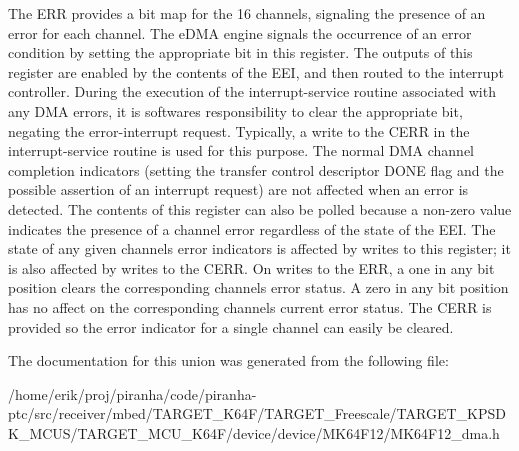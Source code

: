 The E\+RR provides a bit map for the 16 channels, signaling the presence of an error for each channel. The e\+D\+MA engine signals the occurrence of an error condition by setting the appropriate bit in this register. The outputs of this register are enabled by the contents of the E\+EI, and then routed to the interrupt controller. During the execution of the interrupt-\/service routine associated with any D\+MA errors, it is software\textquotesingle{}s responsibility to clear the appropriate bit, negating the error-\/interrupt request. Typically, a write to the C\+E\+RR in the interrupt-\/service routine is used for this purpose. The normal D\+MA channel completion indicators (setting the transfer control descriptor D\+O\+NE flag and the possible assertion of an interrupt request) are not affected when an error is detected. The contents of this register can also be polled because a non-\/zero value indicates the presence of a channel error regardless of the state of the E\+EI. The state of any given channel\textquotesingle{}s error indicators is affected by writes to this register; it is also affected by writes to the C\+E\+RR. On writes to the E\+RR, a one in any bit position clears the corresponding channel\textquotesingle{}s error status. A zero in any bit position has no affect on the corresponding channel\textquotesingle{}s current error status. The C\+E\+RR is provided so the error indicator for a single channel can easily be cleared. 

The documentation for this union was generated from the following file\+:\begin{DoxyCompactItemize}
\item 
/home/erik/proj/piranha/code/piranha-\/ptc/src/receiver/mbed/\+T\+A\+R\+G\+E\+T\+\_\+\+K64\+F/\+T\+A\+R\+G\+E\+T\+\_\+\+Freescale/\+T\+A\+R\+G\+E\+T\+\_\+\+K\+P\+S\+D\+K\+\_\+\+M\+C\+U\+S/\+T\+A\+R\+G\+E\+T\+\_\+\+M\+C\+U\+\_\+\+K64\+F/device/device/\+M\+K64\+F12/M\+K64\+F12\+\_\+dma.\+h\end{DoxyCompactItemize}
